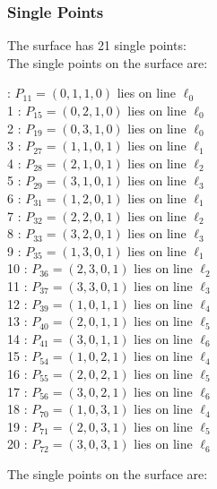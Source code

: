 \documentclass{article}
\begin{document}
{\subsubsection*{Single Points}
The surface has 21 single points:\\
The single points on the surface are:\\
\begin{multicols}{2}
 : $P_{11}=( 0, 1, 1, 0 )$ lies on line $\ell_{0}$\\
1 : $P_{15}=( 0, 2, 1, 0 )$ lies on line $\ell_{0}$\\
2 : $P_{19}=( 0, 3, 1, 0 )$ lies on line $\ell_{0}$\\
3 : $P_{27}=( 1, 1, 0, 1 )$ lies on line $\ell_{1}$\\
4 : $P_{28}=( 2, 1, 0, 1 )$ lies on line $\ell_{2}$\\
5 : $P_{29}=( 3, 1, 0, 1 )$ lies on line $\ell_{3}$\\
6 : $P_{31}=( 1, 2, 0, 1 )$ lies on line $\ell_{1}$\\
7 : $P_{32}=( 2, 2, 0, 1 )$ lies on line $\ell_{2}$\\
8 : $P_{33}=( 3, 2, 0, 1 )$ lies on line $\ell_{3}$\\
9 : $P_{35}=( 1, 3, 0, 1 )$ lies on line $\ell_{1}$\\
10 : $P_{36}=( 2, 3, 0, 1 )$ lies on line $\ell_{2}$\\
11 : $P_{37}=( 3, 3, 0, 1 )$ lies on line $\ell_{3}$\\
12 : $P_{39}=( 1, 0, 1, 1 )$ lies on line $\ell_{4}$\\
13 : $P_{40}=( 2, 0, 1, 1 )$ lies on line $\ell_{5}$\\
14 : $P_{41}=( 3, 0, 1, 1 )$ lies on line $\ell_{6}$\\
15 : $P_{54}=( 1, 0, 2, 1 )$ lies on line $\ell_{4}$\\
16 : $P_{55}=( 2, 0, 2, 1 )$ lies on line $\ell_{5}$\\
17 : $P_{56}=( 3, 0, 2, 1 )$ lies on line $\ell_{6}$\\
18 : $P_{70}=( 1, 0, 3, 1 )$ lies on line $\ell_{4}$\\
19 : $P_{71}=( 2, 0, 3, 1 )$ lies on line $\ell_{5}$\\
20 : $P_{72}=( 3, 0, 3, 1 )$ lies on line $\ell_{6}$\\
\end{multicols}
The single points on the surface are:\\
}
\end{document}
